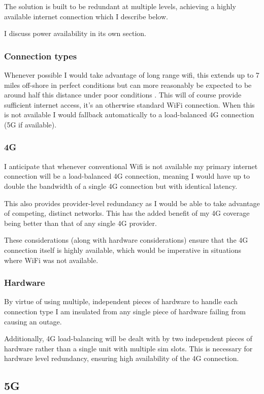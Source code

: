 The solution is built to be redundant at multiple levels, achieving a highly available internet connection which I describe below.

I discuss power availability in its own section.

\subsubsection{Connection types}
Whenever possible I would take advantage of long range wifi, this extends up to 7 miles off-shore in perfect conditions but can more reasonably be expected to be around half this distance under poor conditions \cite{long-range-wifi}. This will of course provide sufficient internet access, it's an otherwise standard WiFi connection. When this is not available I would fallback automatically to a load-balanced 4G connection (5G if available).

\subsubsection{4G}

I anticipate that whenever conventional Wifi is not available my primary internet connection will be a load-balanced 4G connection, meaning I would have up to double the bandwidth of a single 4G connection but with identical latency.

This also provides provider-level redundancy as I would be able to take advantage of competing, distinct networks. This has the added benefit of my 4G coverage being better than that of any single 4G provider.

These considerations (along with hardware considerations) ensure that the 4G connection itself is highly available, which would be imperative in situations where WiFi was not available. 

\subsubsection{Hardware}
By virtue of using multiple, independent pieces of hardware to handle each connection type I am insulated from any single piece of hardware failing from causing an outage.

Additionally, 4G load-balancing will be dealt with by two independent pieces of hardware rather than a single unit with multiple sim slots. This is necessary for hardware level redundancy, ensuring high availability of the 4G connection.

\subsection{5G}

